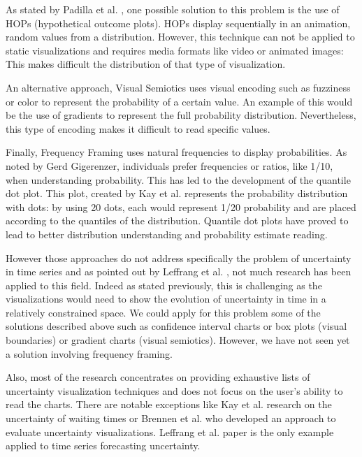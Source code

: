 \documentclass[a4paper,3p,sort&compress]{elsarticle}
\begin{document}
As stated by Padilla et al. \cite{padilla_uncertainty_2021}, one possible solution to this problem is the use of HOPs 
(hypothetical outcome plots). HOPs display 
sequentially in an animation, random values from a distribution. However, this technique can not be 
applied to static visualizations and requires media formats like video or animated images: This makes difficult the distribution 
of that type of visualization.

An alternative approach, Visual Semiotics uses visual encoding such as fuzziness or color to represent 
the probability of a certain value. An example of this would be the use of gradients to represent the 
full probability distribution. Nevertheless, this type of encoding makes it difficult to read specific 
values. 

Finally, Frequency Framing uses natural frequencies to display probabilities. As noted by Gerd 
Gigerenzer, individuals prefer frequencies or ratios, like 1/10, when understanding probability. This has 
led to the development of the quantile dot plot. This plot, created by Kay et al. 
\cite{2016-when-ish-is-my-bus} 
represents 
the probability distribution with dots: by using 20 dots, each would represent 1/20 probability 
and are placed according 
to the quantiles of the distribution. Quantile dot plots have proved to lead to better distribution 
understanding and probability estimate reading. 

However those approaches do not address specifically the problem of uncertainty in time series 
and as pointed out by Leffrang et al. \cite{leffrang_should_2021}, not much research has been applied to this 
field. Indeed as stated previously, this is challenging as the visualizations would need to show the evolution 
of uncertainty in time in a relatively constrained space. We could apply for this problem some of the solutions 
described above such as confidence interval charts or 
box plots (visual boundaries) or gradient charts (visual semiotics). However, we have not seen yet a solution involving 
frequency framing. 

Also, most of the research concentrates on providing exhaustive lists of uncertainty visualization techniques and does not 
focus on the user's ability to read the charts. There are notable exceptions like Kay et al. \cite{2016-when-ish-is-my-bus}
research on the uncertainty of waiting times or Brennen et al. \cite{brennen_instrument_2018} who developed an 
approach to evaluate uncertainty visualizations.
Leffrang et al. \cite{leffrang_should_2021} paper is the only example applied to time series forecasting uncertainty.
\end{document}
